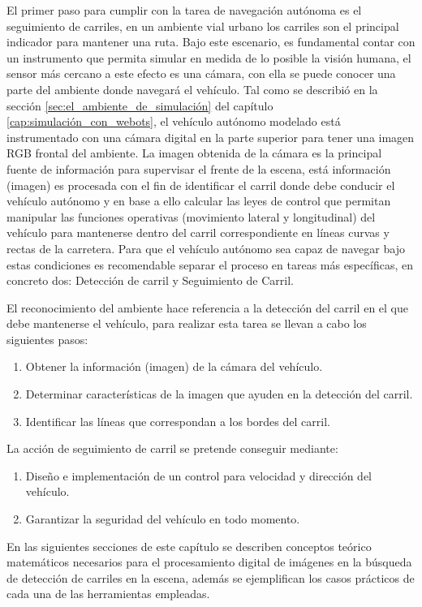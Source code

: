 El primer paso para cumplir con la tarea de navegación autónoma es el seguimiento de carriles, en un ambiente vial urbano los carriles son el principal indicador para mantener una ruta. Bajo este escenario, es fundamental contar con un instrumento que permita simular en medida de lo posible la visión humana, el sensor más cercano a este efecto es una cámara, con ella se puede conocer una parte del ambiente donde navegará el vehículo. Tal como se describió en la sección \ref{sec:el_ambiente_de_simulación} del capítulo \ref{cap:simulación_con_webots}, el vehículo autónomo modelado está instrumentado con una cámara digital en la parte superior para tener una imagen RGB frontal del ambiente. La imagen obtenida de la cámara es la principal fuente de información para supervisar el frente de la escena, está información (imagen) es procesada con el fin de identificar el carril donde debe conducir el vehículo autónomo y en base a ello calcular las leyes de control que permitan manipular las funciones operativas (movimiento lateral y longitudinal) del vehículo para mantenerse dentro del carril correspondiente en líneas curvas y rectas de la carretera. Para que el vehículo autónomo sea capaz de navegar bajo estas condiciones es recomendable separar el proceso en tareas más específicas, en concreto dos: Detección de carril y Seguimiento de Carril.

El reconocimiento del ambiente hace referencia a la detección del carril en el que debe mantenerse el vehículo, para realizar esta tarea se llevan a cabo los siguientes pasos:
\begin{enumerate}
    \item Obtener la información (imagen) de la cámara del vehículo.
    \item Determinar características de la imagen que ayuden en la detección del carril.
    \item Identificar las líneas que correspondan a los bordes del carril.
\end{enumerate}

La acción de seguimiento de carril se pretende conseguir mediante:
\begin{enumerate}
    \item Diseño e implementación de un control para velocidad y dirección del vehículo.
    \item Garantizar la seguridad del vehículo en todo momento.
\end{enumerate}

En las siguientes secciones de este capítulo se describen conceptos teórico matemáticos necesarios para el procesamiento digital de imágenes en la búsqueda de detección de carriles en la escena, además se ejemplifican los casos prácticos de cada una de las herramientas empleadas.

